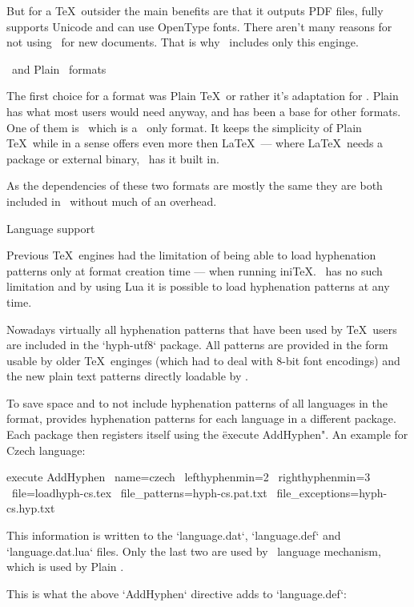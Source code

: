 But for a \TeX\ outsider the main benefits are that it outputs PDF files, fully
supports Unicode and can use OpenType fonts. There aren't many reasons for not
using \LuaTeX\ for new documents. That is why \MMTeX\ includes only this
enginge.

\sec \OpTeX\ and Plain \LuaTeX\ formats

The first choice for a format was Plain \TeX\ or rather it's adaptation for
\LuaTeX. Plain has what most users would need anyway, and has been a base for
other formats. One of them is \OpTeX\ which is a \LuaTeX\ only format. It keeps
the simplicity of Plain \TeX\ while in a sense offers even more then \LaTeX\
--- where \LaTeX\ needs a package or external binary, \OpTeX\ has it built in.

As the dependencies of these two formats are mostly the same they are both
included in \MMTeX\ without much of an overhead.

\sec Language support

Previous \TeX\ engines had the limitation of being able to load hyphenation
patterns only at format creation time --- when running ini\TeX. \LuaTeX\ has no
such limitation and by using Lua it is possible to load hyphenation patterns at
any time.

Nowadays virtually all hyphenation patterns that have been used by \TeX\ users
are included in the `hyph-utf8` package. All patterns are provided in the form
usable by older \TeX\ enginges (which had to deal with 8-bit font encodings)
and the new plain text patterns directly loadable by \LuaTeX.

To save space and to not include hyphenation patterns of all languages in the
format, \TeXLive provides hyphenation patterns for each language in a different
package. Each package then registers itself using the \TeXLive \"execute
AddHyphen". An example for Czech language:

\begtt
execute AddHyphen \
	name=czech \
	lefthyphenmin=2 \
	righthyphenmin=3 \
	file=loadhyph-cs.tex \
	file_patterns=hyph-cs.pat.txt \
	file_exceptions=hyph-cs.hyp.txt
\endtt

This information is written to the `language.dat`, `language.def` and
`language.dat.lua` files. Only the last two are used by \eTeX\ language
mechanism, which is used by Plain \LuaTeX.

This is what the above `AddHyphen` directive adds to `language.def`:

\begtt
\addlanguage{czech}{loadhyph-cs.tex}{}{2}{3}
\endtt


